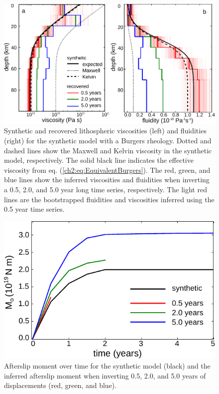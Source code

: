 \begin{figure}
\includegraphics{ch2/figures/Fig8.pdf}
\caption{Synthetic and recovered lithospheric viscosities (left) and
fluidities (right) for the synthetic model with a Burgers rheology.
Dotted and dashed lines show the Maxwell and Kelvin viscosity in the
synthetic model, respectively.  The solid black line indicates the
effective viscosity from eq. (\ref{ch2:eq:EquivalentBurgers}).  The red,
green, and blue lines show the inferred viscosities and fluidities
when inverting a 0.5, 2.0, and 5.0 year long time series,
respectively.  The light red lines are the bootstrapped fluidities and
viscosities inferred using the 0.5 year time series.}
\label{ch2:fig:8}
\end{figure}

\begin{figure}
\includegraphics{ch2/figures/Fig9.pdf}
\caption{Afterslip moment over time for the synthetic model (black)
and the inferred afterslip moment when inverting 0.5, 2.0, and 5.0
years of displacements (red, green, and blue).}
\label{ch2:fig:9}
\end{figure}


